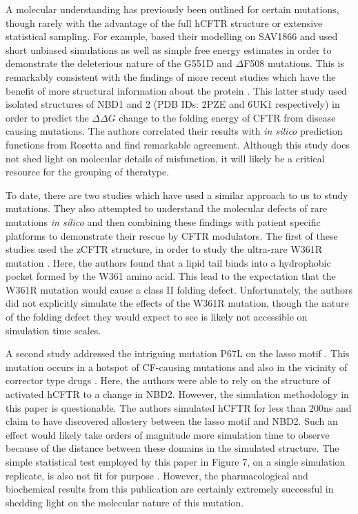 A molecular understanding has previously been outlined for certain mutations, though rarely with the advantage of the full hCFTR structure or extensive statistical sampling. For example, \cite{belmonte2015} based their modelling on SAV1866 and used short unbiased simulations as well as simple free energy estimates in order to demonstrate the deleterious nature of the G551D and $\Delta$F508 mutations. This is remarkably consistent with the findings of more recent studies which have the benefit of more structural information about the protein \cite{bahia2021}. This latter study used isolated structures of NBD1 and 2 (PDB IDs: 2PZE \cite{atwell2010} and 6UK1 \cite {wang_2020_nbd2_CFTR_isoalted_pdb_alone} respectively) in order to predict the $\Delta\Delta G$ change to the folding energy of CFTR from disease causing mutations. The authors correlated their results with \textit{in silico} prediction functions from Rosetta and find remarkable agreement. Although this study does not shed light on molecular details of misfunction, it will likely be a critical resource for the grouping of theratype. 

To date, there are two studies which have used a similar approach to us to study mutations. They also attempted to understand the molecular defects of rare mutations \textit{in silico} and then combining these findings with patient specific platforms to demonstrate their rescue by CFTR modulators. The first of these studies used the zCFTR structure, in order to study the ultra-rare W361R mutation \cite{billet2020}. Here, the authors found that a lipid tail binds into a hydrophobic pocket formed by the W361 amino acid. This lead to the expectation that the W361R mutation would cause a class II folding defect. Unfortunately, the authors did not explicitly simulate the effects of the W361R mutation, though the nature of the folding defect they would expect to see is likely not accessible on simulation time scales.

A second study addressed the intriguing mutation P67L on the lasso motif \cite{sabusap2021}. This mutation occurs in a hotspot of CF-causing mutations and also in the vicinity of corrector type drugs \cite{gene2008, fiedorczuk2022}. Here, the authors were able to rely on the structure of activated hCFTR to  a change in NBD2. However, the simulation methodology in this paper is questionable. The authors simulated hCFTR for less than 200ns and claim to have discovered allostery between the lasso motif and NBD2. Such an effect would likely take orders of magnitude more simulation time to observe because of the distance between these domains in the simulated structure. The simple statistical test employed by this paper in Figure 7, on a single simulation replicate, is also not fit for purpose \cite{knapp2018}. However, the pharmacological and biochemical results from this publication are certainly extremely successful in shedding light on the molecular nature of this mutation.

